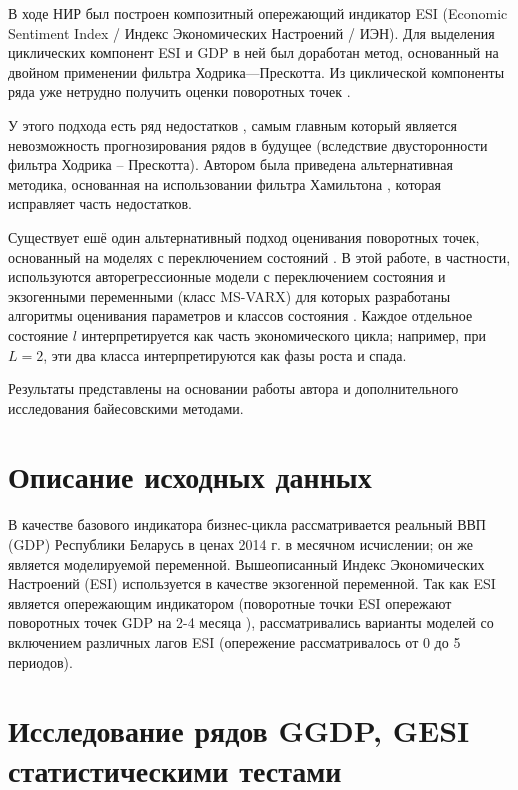 \documentclass[a4paper,14pt]{extreport}
\begin{document}
В ходе НИР \cite{esiMaking} был построен композитный опережающий индикатор ESI (Economic Sentiment Index / Индекс Экономических Настроений / ИЭН). Для выделения циклических компонент ESI и GDP в ней был доработан метод, основанный на двойном применении фильтра Ходрика—Прескотта. Из циклической компоненты ряда уже нетрудно получить оценки поворотных точек \cite{esiMaking,esiExtra}. 

У этого подхода есть ряд недостатков \cite{ham_never_hp}, самым главным который является невозможность прогнозирования рядов в будущее (вследствие двусторонности фильтра Ходрика -- Прескотта). Автором была приведена альтернативная методика, основанная на использовании фильтра Хамильтона \cite{mak_mal_bv_2018}, которая исправляет часть недостатков.

Существует ешё один альтернативный подход оценивания поворотных точек, основанный на моделях с переключением состояний \cite{hamNewApproach}. В этой работе, в частности, используются авторегрессионные модели с переключением состояния и экзогенными переменными (класс MS-VARX) для которых разработаны алгоритмы оценивания параметров и классов состояния \cite{malNovopMSVARX,rs_persio2014,goutte_hal_00747479}. Каждое отдельное состояние $l$ интерпретируется как часть экономического цикла; например, при $L=2$, эти два класса интерпретируются как фазы роста и спада. 

Результаты представлены на основании работы автора \cite{mak_mal_bv_2020} и дополнительного исследования байесовскими методами.


\section{Описание исходных данных}

В качестве базового индикатора бизнес-цикла рассматривается реальный ВВП (GDP) Республики Беларусь в ценах 2014 г. в месячном исчислении; он же является моделируемой переменной. Вышеописанный Индекс Экономических Настроений (ESI) используется в качестве экзогенной переменной. Так как ESI является опережающим индикатором (поворотные точки ESI опережают поворотных точек GDP на 2-4 месяца \cite{esiMaking,esiExtra}), рассматривались варианты моделей со включением различных лагов ESI (опережение рассматривалось от 0 до 5 периодов).


\section{Исследование рядов GGDP, GESI статистическими тестами}
\end{document}
